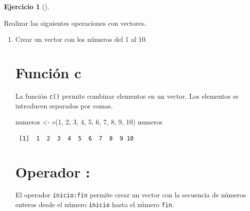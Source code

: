 \documentclass[
  a4paper,
]{scrreport}
\newenvironment{Shaded}{\begin{snugshade}}{\end{snugshade}}
\newcommand{\DecValTok}[1]{\textcolor[rgb]{0.68,0.00,0.00}{#1}}
\newcommand{\FunctionTok}[1]{\textcolor[rgb]{0.28,0.35,0.67}{#1}}
\newcommand{\NormalTok}[1]{\textcolor[rgb]{0.00,0.23,0.31}{#1}}
\newcommand{\OtherTok}[1]{\textcolor[rgb]{0.00,0.23,0.31}{#1}}
\theoremstyle{definition}
\newtheorem{exercise}{Ejercicio}[chapter]
\theoremstyle{remark}
\begin{document}
\begin{exercise}[]\protect\hypertarget{exr-vectores-1}{}\label{exr-vectores-1}

Realizar las siguientes operaciones con vectores.

\begin{enumerate}
\def\labelenumi{\alph{enumi}.}
\item
  Crear un vector con los números del 1 al 10.

  \begin{tcolorbox}[enhanced jigsaw, colframe=quarto-callout-tip-color-frame, toprule=.15mm, bottomtitle=1mm, breakable, opacitybacktitle=0.6, toptitle=1mm, colback=white, bottomrule=.15mm, title=\textcolor{quarto-callout-tip-color}{\faLightbulb}\hspace{0.5em}{Solución}, arc=.35mm, left=2mm, titlerule=0mm, rightrule=.15mm, coltitle=black, leftrule=.75mm, opacityback=0, colbacktitle=quarto-callout-tip-color!10!white]

  \section{Función c}

  La función \texttt{c()} permite combinar elementos en un vector. Los
  elementos se introducen separados por comas.

\begin{Shaded}
\begin{Highlighting}[]
\NormalTok{numeros }\OtherTok{\textless{}{-}} \FunctionTok{c}\NormalTok{(}\DecValTok{1}\NormalTok{, }\DecValTok{2}\NormalTok{, }\DecValTok{3}\NormalTok{, }\DecValTok{4}\NormalTok{, }\DecValTok{5}\NormalTok{, }\DecValTok{6}\NormalTok{, }\DecValTok{7}\NormalTok{, }\DecValTok{8}\NormalTok{, }\DecValTok{9}\NormalTok{, }\DecValTok{10}\NormalTok{)}
\NormalTok{numeros}
\end{Highlighting}
\end{Shaded}

\begin{verbatim}
 [1]  1  2  3  4  5  6  7  8  9 10
\end{verbatim}

  \section{Operador :}

  El operador \texttt{inicio:fin} permite crear un vector con la
  secuencia de números enteros desde el número \texttt{inicio} hasta el
  número \texttt{fin}.


\end{tcolorbox}
\end{enumerate}
\end{exercise}
\end{document}
